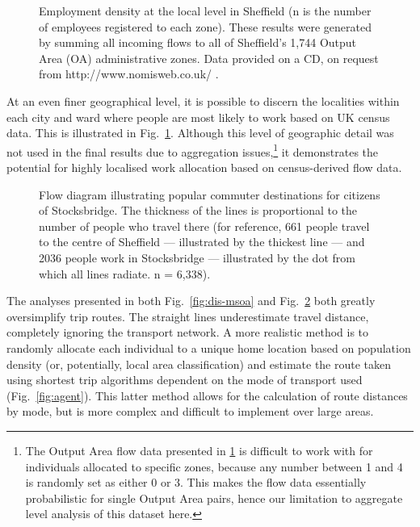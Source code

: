 \begin{figure}
\caption[Employment density at the local level in Sheffield]
{Employment density at the local level in Sheffield (n is the number of
employees registered to each zone). These results
were generated by summing all incoming flows to all of Sheffield's 1,744
Output Area (OA) administrative zones. Data provided on a CD, on request from
http://www.nomisweb.co.uk/ .}
\label{fig:sworkdens}
\end{figure}
At an even finer geographical level, it is possible to discern the localities
within each city and ward where people are most likely to work based on UK
census data. This is illustrated in Fig.~\ref{fig:sworkdens}. Although this
level of geographic detail was not used in the final
results due to aggregation
issues,\footnote{The
Output Area flow data presented in \ref{fig:sworkdens} is difficult
to work with for individuals allocated to specific zones, because any
number between 1 and 4 is randomly set as either 0 or 3. This makes
the flow data essentially probabilistic for single Output Area pairs,
hence our limitation to aggregate level analysis of this dataset here.
}
it demonstrates the potential for highly localised work allocation based on
census-derived flow data.

\begin{figure}
\caption[Flow diagram of commuter destinations from Stocksbridge]
{Flow diagram illustrating popular commuter destinations for citizens
of Stocksbridge. The thickness of the lines is proportional to the number of
people who travel there (for reference, 661 people travel to
the centre of Sheffield --- illustrated by the thickest line ---
and 2036 people work in Stocksbridge --- illustrated by the dot
from which all lines radiate. n = 6,338).}
\label{fig:sflow}
\end{figure}

The analyses presented in both Fig.~\ref{fig:dis-msoa} and Fig.~\ref{fig:sflow}
both greatly oversimplify trip routes. The straight lines underestimate travel
distance, completely ignoring the transport network. A more
realistic method is to randomly allocate each individual to a unique home
location based on
population density (or, potentially, local area classification) and estimate
the route taken using shortest trip algorithms dependent on the mode of
transport used (Fig.~\ref{fig:agent}). This latter method allows for the
calculation of route distances by mode, but is more complex and difficult to
implement over large areas.

